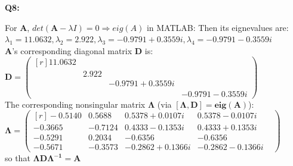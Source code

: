 \documentclass[a4paper,fleqn]{article}
\newcommand{\newvec}[1]{
    \begin{pmatrix*}[r]
        #1
    \end{pmatrix*}
}
\begin{document}
    \newpage
    \Large{\textbf{Q8:}}

    \noindent For $\mathbf{A}$, $det(\mathbf{A}-\lambda I)=0 \Longrightarrow eig(A)$ in MATLAB: Then its eignevalues are: \\ 
    $\lambda_1=11.0632, \lambda_2=2.922, \lambda_3=-0.9791+0.3559i, \lambda_4=-0.9791-0.3559i$\\
    $\mathbf{A}$'s corresponding diagonal matrix $\mathbf{D}$ is: \\
    $\mathbf{D} = \newvec{11.0632\\&2.922\\&&-0.9791+0.3559i\\&&&-0.9791-0.3559i}$\\
    The corresponding nonsingular matrix $\mathbf{\Lambda}$ (via $\mathbf{[\Lambda, D]=eig(A)}$): \\
    $\mathbf{\Lambda}=\newvec{-0.5140&0.5688&0.5378 + 0.0107i&0.5378 - 0.0107i\\-0.3665& -0.7124&  0.4333 - 0.1353i&   0.4333 + 0.1353i\\-0.5291&  0.2034&  -0.6356& -0.6356&\\-0.5671& -0.3573&  -0.2862 + 0.1366i & -0.2862 - 0.1366i}$\\
    so that $\mathbf{\Lambda D\Lambda^{-1}=A}$
\end{document}
